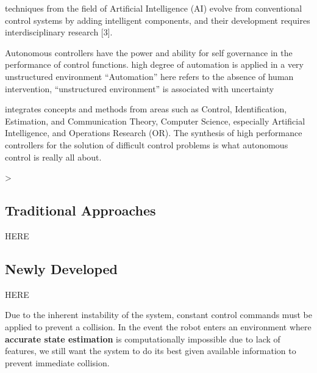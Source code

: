 techniques  from  the  field  of  Artificial  Intelligence  (AI)  
    evolve  from  conventional  control  systems  by  adding  intelligent  components,  and  their  development requires interdisciplinary research [3]. 

Autonomous  controllers  have  the  power  and  ability  for  self  governance  in  the  performance  of  control  functions.
high  degree   of   automation   is   applied   in   a   very   unstructured   environment
“Automation”  here  refers  to  the  absence  of  human   intervention,
“unstructured   environment”   is   associated with uncertainty

integrates concepts and methods from areas such as Control, Identification,   Estimation,   and   Communication   Theory,   Computer   Science,   especially   Artificial   Intelligence,   and   Operations  Research  (OR).  
The   synthesis   of   high   performance   controllers  for  the  solution  of  difficult  control  problems  is  what autonomous control is really all about.  

>

\subsection{Traditional Approaches}

HERE


\subsection{Newly Developed}
HERE


Due to the inherent instability of the system, constant control commands must be applied to
prevent a collision. In the event the robot enters an environment where \textbf{accurate state estimation}
is computationally impossible due to lack of features, we still want the system to do its best given
available information to prevent immediate collision.